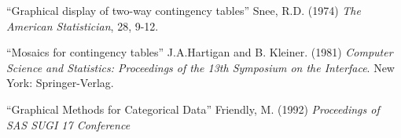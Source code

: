\documentclass[a4paper]{report}
\begin{document}
\begin{thebibliography}{99}

 ``Graphical display of two-way contingency tables'' Snee, R.D.
  (1974) \textit{ The American Statistician}, 28, 9-12.

 ``Mosaics for contingency tables'' J.A.Hartigan and B.
  Kleiner. (1981) \textit{ Computer Science and Statistics:
    Proceedings of the 13th Symposium on the Interface}. New York:
  Springer-Verlag.

 ``Graphical Methods for Categorical Data'' Friendly, M.
  (1992) \textit{Proceedings of SAS SUGI 17 Conference}

\end{thebibliography}
\end{document}
